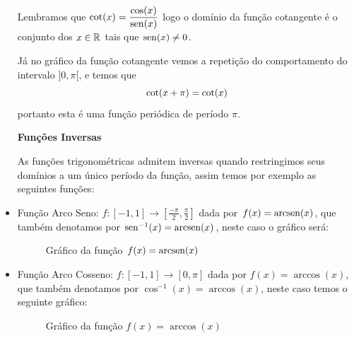 \begin{itemize}
  Lembramos que $\operatorname{cot}(x)= \dfrac{\cos(x)}{\operatorname{sen}(x)}$ logo o domínio da função cotangente é o conjunto dos $x \in \mathbb{R}$ tais que $\operatorname{sen}(x) \neq 0$.

  Já no gráfico da função cotangente vemos a repetição do comportamento do intervalo $]0, \pi[$, e temos que
\begin{equation}
\operatorname{cot}(x + \pi)= \operatorname{cot}(x)
\end{equation}
  portanto esta é uma função periódica de período $\pi$.

  \textbf{Funções Inversas}

  As funções trigonométricas admitem inversas quando restringimos seus domínios a um único período da função, assim temos por exemplo as seguintes funções:

  \item Função Arco Seno: $f: [-1, 1] \rightarrow [\frac{-\pi}{2}, \frac{\pi}{2}]$ dada por $f(x)= \operatorname{arcsen}(x)$, que também denotamos por $\operatorname{sen}^{-1}(x)= \operatorname{arcsen}(x)$, neste caso o gráfico será:

  \begin{figure}[H]
  \centering
    \caption{Gráfico da função $f(x)= \operatorname{arcsen}(x)$}
  \end{figure}


  \item Função Arco Cosseno: $f: [-1, 1] \rightarrow [0, \pi]$ dada por $f(x)= \arccos(x)$, que também denotamos por $\cos^{-1}(x)= \arccos (x)$, neste caso temos o seguinte gráfico:

  \begin{figure}[H]
  \centering
    \caption{Gráfico da função $f(x)= \arccos(x)$}
  \end{figure}



\end{itemize}

